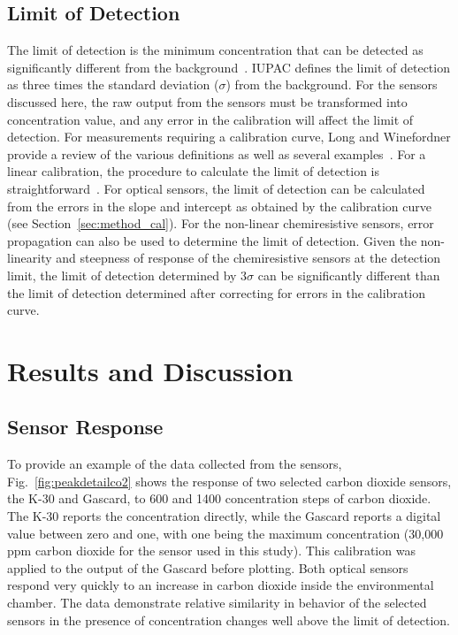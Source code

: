 \documentclass[times]{joehreview}
\begin{document}
	\subsection{Limit of Detection}
	\label{sec:method_detection}
	The limit of detection is the minimum concentration that can be detected as significantly different from the background~\cite{long_limit_1983,currie_detection:_1997,mocak_j._statistical_2009}.  IUPAC defines the limit of detection as three times the standard deviation ($\sigma$) from the background.  For the sensors discussed here, the raw output from the sensors must be transformed into concentration value, and any error in the calibration will affect the limit of detection. For measurements requiring a calibration curve, Long and Winefordner provide a review of the various definitions as well as several examples~\cite{long_limit_1983}.  For a linear calibration, the procedure to calculate the limit of detection is straightforward~\cite{long_limit_1983}.  For optical sensors, the limit of detection can be calculated from the errors in the slope and intercept as obtained by the calibration curve (see Section~\ref{sec:method_cal}).  For the non-linear chemiresistive sensors, error propagation can also be used to determine the limit of detection. Given the non-linearity and steepness of response of the chemiresistive sensors at the detection limit, the limit of detection determined by $3\sigma$ can be significantly different than the limit of detection determined after correcting for errors in the calibration curve.
	
	\section{Results and Discussion}
	
	\subsection{Sensor Response}
	\label{sec:time}
	
	To provide an example of the data collected from the sensors, Fig.~\ref{fig:peakdetailco2} shows the response of two selected carbon dioxide sensors, the K-30 and Gascard, to 600 and 1400 concentration steps of carbon dioxide.  The K-30 reports the concentration directly, while the Gascard reports a digital value between zero and one, with one being the maximum concentration (30,000 ppm carbon dioxide for the sensor used in this study).  This calibration was applied to the output of the Gascard before plotting. Both optical sensors respond very quickly to an increase in carbon dioxide inside the environmental chamber.  The data demonstrate relative similarity in behavior of the selected sensors in the presence of concentration changes well above the limit of detection.  
	
\end{document}
